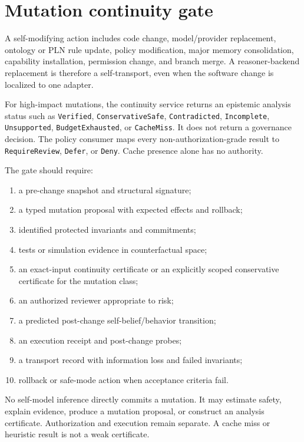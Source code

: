\documentclass[11pt,oneside]{report}
\begin{document}
\section{Mutation continuity gate}

A self-modifying action includes code change, model/provider replacement, ontology or PLN rule update, policy modification, major memory consolidation, capability installation, permission change, and branch merge. A reasoner-backend replacement is therefore a self-transport, even when the software change is localized to one adapter.

For high-impact mutations, the continuity service returns an epistemic analysis status such as \texttt{Verified}, \texttt{ConservativeSafe}, \texttt{Contradicted}, \texttt{Incomplete}, \texttt{Unsupported}, \texttt{BudgetExhausted}, or \texttt{CacheMiss}. It does not return a governance decision. The policy consumer maps every non-authorization-grade result to \texttt{RequireReview}, \texttt{Defer}, or \texttt{Deny}. Cache presence alone has no authority.

The gate should require:

\begin{enumerate}
  \item a pre-change snapshot and structural signature;
  \item a typed mutation proposal with expected effects and rollback;
  \item identified protected invariants and commitments;
  \item tests or simulation evidence in counterfactual space;
  \item an exact-input continuity certificate or an explicitly scoped conservative certificate for the mutation class;
  \item an authorized reviewer appropriate to risk;
  \item a predicted post-change self-belief/behavior transition;
  \item an execution receipt and post-change probes;
  \item a transport record with information loss and failed invariants;
  \item rollback or safe-mode action when acceptance criteria fail.
\end{enumerate}

\begin{invariantbox}
No self-model inference directly commits a mutation. It may estimate safety, explain evidence, produce a mutation proposal, or construct an analysis certificate. Authorization and execution remain separate. A cache miss or heuristic result is not a weak certificate.
\end{invariantbox}
\end{document}
